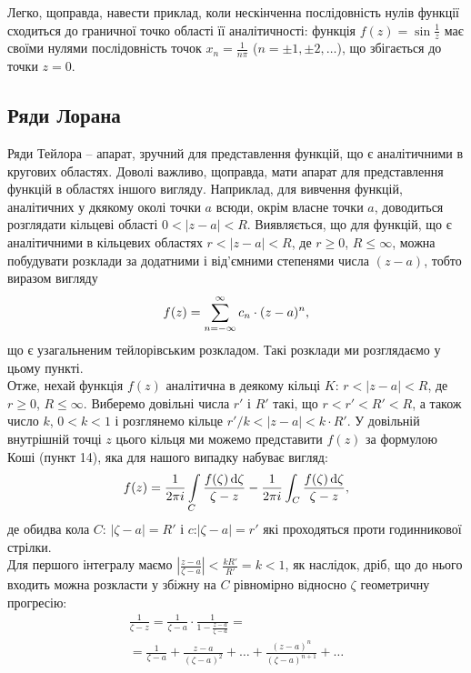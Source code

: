 Легко, щоправда, навести приклад, коли нескінченна послідовність нулів функції сходиться до граничної точко області її аналітичності: функція $f(z) = \sin \frac1z$ має своїми нулями послідовність точок $x_n = \frac{1}{n\pi}$ ($n=\pm1,\pm2,\ldots$), що збігається до точки $z = 0$.

\subsection{Ряди Лорана}

Ряди Тейлора -- апарат, зручний для представлення функцій, що є аналітичними в кругових областях. Доволі важливо, щоправда, мати апарат для представлення функцій в областях іншого вигляду. Наприклад, для вивчення функцій, аналітичних у дкякому околі точки $a$ всюди, окрім власне точки $a$, доводиться розглядати кільцеві області $0 < |z - a| < R$. Виявляється, що для функцій, що є аналітичними в кільцевих областях $r < |z - a| < R$, де $r \ge 0$, $R \le \infty$, можна побудувати розклади за додатними і від'ємними степенями числа $(z - a)$, тобто виразом вигляду
\begin{equation}
	\label{eq:5.4.1}
	f(z) = \displaystyle\sum\limits_{n = - \infty}^{\infty} c_n \cdot (z - a)^n,
\end{equation}
що є узагальненим тейлорівським розкладом. Такі розклади ми розглядаємо у цьому пункті. \\

Отже, нехай функція $f(z)$ аналітична в деякому кільці $K$: $r < |z - a| < R$, де $r \ge 0$, $R \le \infty$. Виберемо довільні числа $r'$ і $R'$ такі, що $r < r' < R' < R$, а також число $k$, $0 < k < 1$ і розглянемо кільце $r' / k  < |z - a| < k \cdot R'$. У довільній внутрішній точці $z$ цього кільця ми можемо представити $f(z)$ за формулою Коші (пункт 14), яка для нашого випадку набуває вигляд:
\begin{equation}
	\label{eq:5.4.2}
	f(z) = \frac{1}{2 \pi i} \displaystyle\int\limits_C \frac{f(\zeta) \mathop{}\!\mathrm{d} \zeta}{\zeta - z} - \frac{1}{2 \pi i} \int_C \frac{f(\zeta) \mathop{}\!\mathrm{d} \zeta}{\zeta - z},
\end{equation}
де обидва кола $C$: $|\zeta - a| = R'$ і $c$:$ |\zeta - a| = r'$ які проходяться проти годинникової стрілки.  \\

Для першого інтегралу маємо $\left| \frac{z - a}{\zeta - a} \right| < \frac{k R'}{R'} = k < 1$, як наслідок, дріб, що до нього входить можна розкласти у збіжну на $C$ рівномірно відносно $\zeta$ геометричну прогресію:
\begin{multline*}
	\frac{1}{\zeta - z} = \frac{1}{\zeta - a} \cdot \frac{1}{1 - \frac{z - a}{\zeta - a}} = \\ = \frac{1}{\zeta - a} + \frac{z - a}{(\zeta - a)^2} + \ldots + \frac{(z - a)^n}{(\zeta - a)^{n +1}} + \ldots
\end{multline*}

